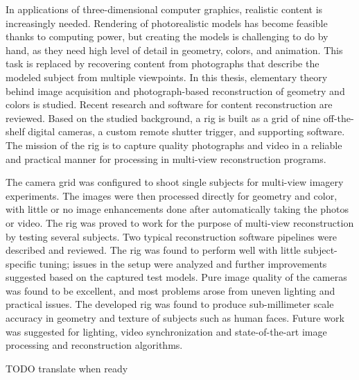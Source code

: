 \begin{abstractpage}[english]
In applications of three-dimensional computer graphics, realistic content is increasingly needed.
Rendering of photorealistic models has become feasible thanks to computing power, but creating the models is challenging to do by hand, as they need high level of detail in geometry, colors, and animation.
This task is replaced by recovering content from photographs that describe the modeled subject from multiple viewpoints.
In this thesis, elementary theory behind image acquisition and photograph-based reconstruction of geometry and colors is studied.
Recent research and software for content reconstruction are reviewed.
Based on the studied background, a rig is built as a grid of nine off-the-shelf digital cameras, a custom remote shutter trigger, and supporting software.
The mission of the rig is to capture quality photographs and video in a reliable and practical manner for processing in multi-view reconstruction programs.

The camera grid was configured to shoot single subjects for multi-view imagery experiments.
The images were then processed directly for geometry and color, with little or no image enhancements done after automatically taking the photos or video.
The rig was proved to work for the purpose of multi-view reconstruction by testing several subjects.
Two typical reconstruction software pipelines were described and reviewed.
The rig was found to perform well with little subject-specific tuning;
issues in the setup were analyzed and further improvements suggested based on the captured test models.
Pure image quality of the cameras was found to be excellent, and most problems arose from uneven lighting and practical issues.
The developed rig was found to produce sub-millimeter scale accuracy in geometry and texture of subjects such as human faces.
Future work was suggested for lighting, video synchronization and state-of-the-art image processing and reconstruction algorithms.
\end{abstractpage}

\newpage

\keywords{}
\begin{abstractpage}[finnish]
	TODO translate when ready
\end{abstractpage}
